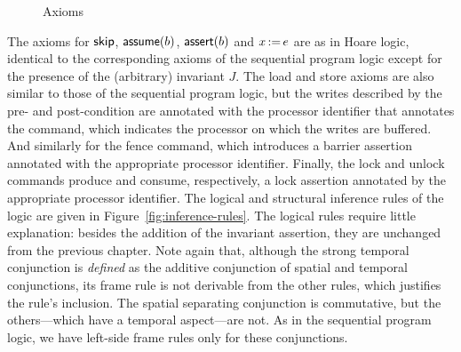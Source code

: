 \documentclass[11pt]{report}
\begin{document}
\begin{figure}[ht]
	\centering
	\caption{\label{fig:axioms}Axioms}
\end{figure}

The axioms for $\operatorname{\mathsf{skip}}$, $\operatorname{\mathsf{assume}}(b)$, $\operatorname{\mathsf{assert}}(b)$ and $x \operatorname{:\!=} e$ are as in Hoare logic, identical to the corresponding axioms of the sequential program logic except for the presence of the (arbitrary) invariant $J$. The load and store axioms are also similar to those of the sequential program logic, but the writes described by the pre- and post-condition are annotated with the processor identifier that annotates the command, which indicates the processor on which the writes are buffered. And similarly for the fence command, which introduces a barrier assertion annotated with the appropriate processor identifier. Finally, the lock and unlock commands produce and consume, respectively, a lock assertion annotated by the appropriate processor identifier. 
The logical and structural inference rules of the logic are given in Figure~\ref{fig:inference-rules}. The logical rules require little explanation: besides the addition of the invariant assertion, they are unchanged from the previous chapter. Note again that, although the strong temporal conjunction is \emph{defined} as the additive conjunction of spatial and temporal conjunctions, its frame rule is not derivable from the other rules, which justifies the rule's inclusion. The spatial separating conjunction is commutative, but the others---which have a temporal aspect---are not. As in the sequential program logic, we have left-side frame rules only for these conjunctions. 
\end{document}
